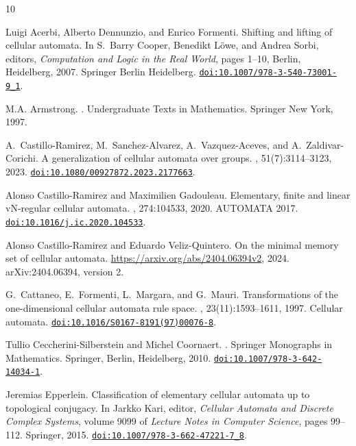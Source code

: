 \documentclass[11pt,a4paper]{article}
\newenvironment{revision}{\color{blue}}{}
\newenvironment{revision}{\color{black}}{}
\newcommand{\doi}[1]{\href{https://doi.org/#1}{\nolinkurl{doi:#1}}}
\begin{document}
\begin{revision}
\begin{thebibliography}{10}

Luigi Acerbi, Alberto Dennunzio, and Enrico Formenti.
\newblock Shifting and lifting of cellular automata.
\newblock In S.~Barry Cooper, Benedikt L{\"o}we, and Andrea Sorbi, editors,
  {\em Computation and Logic in the Real World}, pages 1--10, Berlin,
  Heidelberg, 2007. Springer Berlin Heidelberg.
\newblock \doi{10.1007/978-3-540-73001-9_1}.

M.A. Armstrong.
.
\newblock Undergraduate Texts in Mathematics. Springer New York, 1997.

A.~Castillo-Ramirez, M.~Sanchez-Alvarez, A.~Vazquez-Aceves, and
  A.~Zaldivar-Corichi.
\newblock A generalization of cellular automata over groups.
, 51(7):3114--3123, 2023.
\newblock \doi{10.1080/00927872.2023.2177663}.

Alonso Castillo-Ramirez and Maximilien Gadouleau.
\newblock Elementary, finite and linear {vN}-regular cellular automata.
, 274:104533, 2020.
\newblock AUTOMATA 2017. \doi{10.1016/j.ic.2020.104533}.

Alonso Castillo-Ramirez and Eduardo Veliz-Quintero.
\newblock On the minimal memory set of cellular automata.
\newblock \url{https://arxiv.org/abs/2404.06394v2}, 2024.
\newblock arXiv:2404.06394, version 2.

G.~Cattaneo, E.~Formenti, L.~Margara, and G.~Mauri.
\newblock Transformations of the one-dimensional cellular automata rule space.
, 23(11):1593--1611, 1997.
\newblock Cellular automata. \doi{10.1016/S0167-8191(97)00076-8}.

Tullio Ceccherini-Silberstein and Michel Coornaert.
.
\newblock Springer Monographs in Mathematics. Springer, Berlin, Heidelberg,
  2010.
\newblock \doi{10.1007/978-3-642-14034-1}.

Jeremias Epperlein.
\newblock Classification of elementary cellular automata up to topological
  conjugacy.
\newblock In Jarkko Kari, editor, {\em Cellular Automata and Discrete Complex
  Systems}, volume 9099 of {\em Lecture Notes in Computer Science}, pages
  99--112. Springer, 2015.
\newblock \doi{10.1007/978-3-662-47221-7_8}.


\end{thebibliography}
\end{revision}
\end{document}

